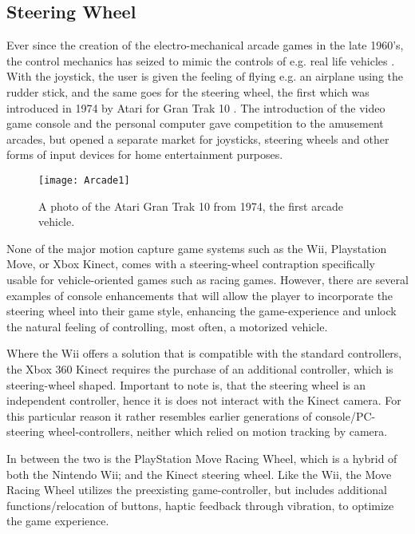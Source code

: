 \subsection{Steering Wheel}
Ever since the creation of the electro-mechanical arcade games in the late 1960's, the control mechanics has seized to mimic the controls of e.g. real life vehicles \parencite{Herz1997}. With the joystick, the user is given the feeling of flying e.g. an airplane using the rudder stick, and the same goes for the steering wheel, the first which was introduced in 1974 by Atari for Gran Trak 10 \parencite{Kohler2005}. The introduction of the video game console and the personal computer gave competition to the amusement arcades, but opened a separate market for joysticks, steering wheels and other forms of input devices for home entertainment purposes. 

\begin{figure}[h] 
\centering
\texttt{[image: Arcade1]} 
\caption{A photo of the Atari Gran Trak 10 from 1974, the first arcade vehicle. }
\label{fig:Arcade}
\end{figure}
\bigskip

None of the major motion capture game systems such as the Wii, Playstation Move, or Xbox Kinect, comes with a steering-wheel contraption specifically usable for vehicle-oriented games such as racing games. However, there are several examples of console enhancements that will allow the player to incorporate the steering wheel into their game style, enhancing the game-experience and unlock the natural feeling of controlling, most often, a motorized vehicle.
\bigskip

Where the Wii offers a solution that is compatible with the standard controllers, the Xbox 360 Kinect requires the purchase of an additional controller, which is steering-wheel shaped. Important to note is, that the steering wheel is an independent controller, hence it is does not interact with the Kinect camera. For this particular reason it rather resembles earlier generations of console/PC-steering wheel-controllers, neither which relied on motion tracking by camera.
\bigskip

In between the two is the PlayStation Move Racing Wheel, which is a hybrid of both the Nintendo Wii; and the Kinect steering wheel. Like the Wii, the Move Racing Wheel utilizes the preexisting game-controller, but includes additional functions/relocation of buttons, haptic feedback through vibration, to optimize the game experience.

